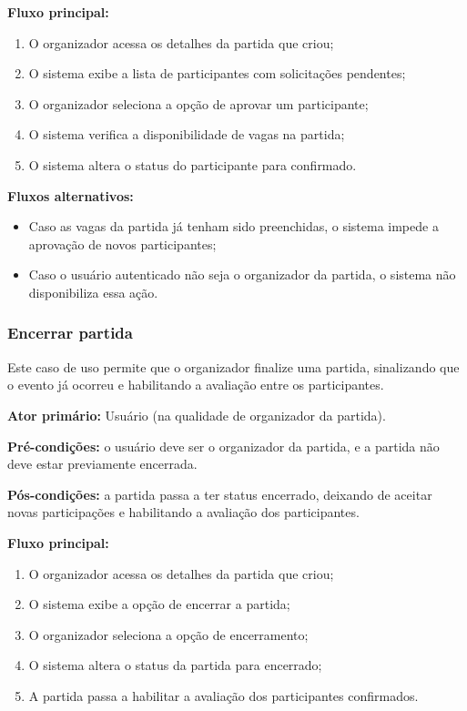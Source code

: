 \documentclass[a4paper, 12pt]{article}
\begin{document}
\begin{justify}
\textbf{Fluxo principal:}

\begin{enumerate}
    \item O organizador acessa os detalhes da partida que criou;
    \item O sistema exibe a lista de participantes com solicitações pendentes;
    \item O organizador seleciona a opção de aprovar um participante;
    \item O sistema verifica a disponibilidade de vagas na partida;
    \item O sistema altera o status do participante para confirmado.
\end{enumerate}

\textbf{Fluxos alternativos:}

\begin{itemize}
    \item Caso as vagas da partida já tenham sido preenchidas, o sistema impede a aprovação de novos participantes;
    \item Caso o usuário autenticado não seja o organizador da partida, o sistema não disponibiliza essa ação.
\end{itemize}

\subsubsection{Encerrar partida}

Este caso de uso permite que o organizador finalize uma partida, sinalizando que o evento já ocorreu e habilitando a avaliação entre os participantes.

\textbf{Ator primário:} Usuário (na qualidade de organizador da partida).

\textbf{Pré-condições:} o usuário deve ser o organizador da partida, e a partida não deve estar previamente encerrada.

\textbf{Pós-condições:} a partida passa a ter status encerrado, deixando de aceitar novas participações e habilitando a avaliação dos participantes.

\textbf{Fluxo principal:}

\begin{enumerate}
    \item O organizador acessa os detalhes da partida que criou;
    \item O sistema exibe a opção de encerrar a partida;
    \item O organizador seleciona a opção de encerramento;
    \item O sistema altera o status da partida para encerrado;
    \item A partida passa a habilitar a avaliação dos participantes confirmados.
\end{enumerate}


\end{justify}
\end{document}
